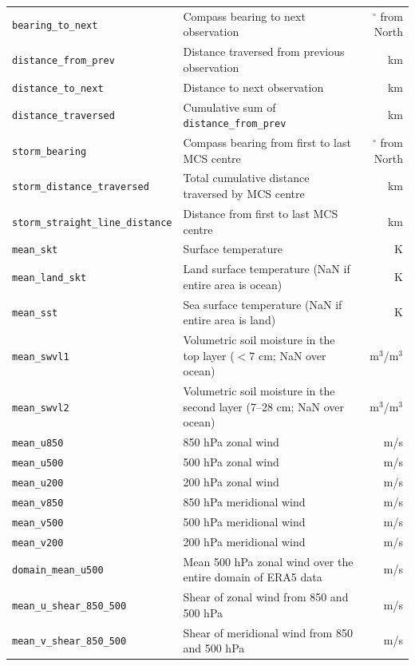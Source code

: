\begin{table}[!ht]
\begin{tabular}{llr}
        \texttt{bearing\_to\_next} & Compass bearing to next observation & $^\circ$ from North \\
        \texttt{distance\_from\_prev} & Distance traversed from previous observation & km \\
        \texttt{distance\_to\_next} & Distance to next observation & km \\
        \texttt{distance\_traversed} & Cumulative sum of \texttt{distance\_from\_prev} & km \\
        \texttt{storm\_bearing} & Compass bearing from first to last MCS centre & $^\circ$ from North \\
        \texttt{storm\_distance\_traversed} & Total cumulative distance traversed by MCS centre & km \\
        \texttt{storm\_straight\_line\_distance} & Distance from first to last MCS centre & km \\
        \texttt{mean\_skt} & Surface temperature & K \\
        \texttt{mean\_land\_skt} & Land surface temperature (NaN if entire area is ocean) & K \\
        \texttt{mean\_sst} & Sea surface temperature (NaN if entire area is land) & K \\
        \texttt{mean\_swvl1} & Volumetric soil moisture in the top layer ($<$7 cm; NaN over ocean) & m$^3$/m$^3$ \\
        \texttt{mean\_swvl2} & Volumetric soil moisture in the second layer (7--28 cm; NaN over ocean) & m$^3$/m$^3$ \\
        \texttt{mean\_u850} & 850 hPa zonal wind & m/s \\
        \texttt{mean\_u500} & 500 hPa zonal wind & m/s \\
        \texttt{mean\_u200} & 200 hPa zonal wind & m/s \\
        \texttt{mean\_v850} & 850 hPa meridional wind & m/s \\
        \texttt{mean\_v500} & 500 hPa meridional wind & m/s \\
        \texttt{mean\_v200} & 200 hPa meridional wind & m/s \\
        \texttt{domain\_mean\_u500} & Mean 500 hPa zonal wind over the entire domain of ERA5 data & m/s \\
        \texttt{mean\_u\_shear\_850\_500} & Shear of zonal wind from 850 and 500 hPa & m/s \\
        \texttt{mean\_v\_shear\_850\_500} & Shear of meridional wind from 850 and 500 hPa & m/s \\

\end{tabular}
\end{table}
